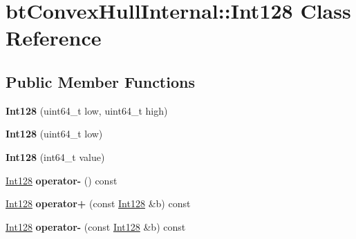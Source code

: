 \hypertarget{classbtConvexHullInternal_1_1Int128}{}\section{bt\+Convex\+Hull\+Internal\+:\+:Int128 Class Reference}
\label{classbtConvexHullInternal_1_1Int128}
\subsection*{Public Member Functions}
\begin{DoxyCompactItemize}
\item 
\mbox{\label{classbtConvexHullInternal_1_1Int128_a714477e7d4f4fc797e840b31140caaea}} 
{\bfseries Int128} (uint64\+\_\+t low, uint64\+\_\+t high)
\item 
\mbox{\label{classbtConvexHullInternal_1_1Int128_a2091782037196f33f46b7ce4e1a4383a}} 
{\bfseries Int128} (uint64\+\_\+t low)
\item 
\mbox{\label{classbtConvexHullInternal_1_1Int128_abdea99e53056edaac085faea14e5be9a}} 
{\bfseries Int128} (int64\+\_\+t value)
\item 
\mbox{\label{classbtConvexHullInternal_1_1Int128_a37beff7787251fcc0363bea4d7964cc7}} 
\hyperlink{classbtConvexHullInternal_1_1Int128}{Int128} {\bfseries operator-\/} () const
\item 
\mbox{\label{classbtConvexHullInternal_1_1Int128_a577a1f677ba00985a6b966ba1b41defb}} 
\hyperlink{classbtConvexHullInternal_1_1Int128}{Int128} {\bfseries operator+} (const \hyperlink{classbtConvexHullInternal_1_1Int128}{Int128} \&b) const
\item 
\mbox{\label{classbtConvexHullInternal_1_1Int128_a98f464eae7ad07e2604e9b27859fed87}} 
\hyperlink{classbtConvexHullInternal_1_1Int128}{Int128} {\bfseries operator-\/} (const \hyperlink{classbtConvexHullInternal_1_1Int128}{Int128} \&b) const
\item 
\mbox{\label{classbtConvexHullInternal_1_1Int128_a8132824f21db5741d80bf64d42489e58}} 

\end{DoxyCompactItemize}
